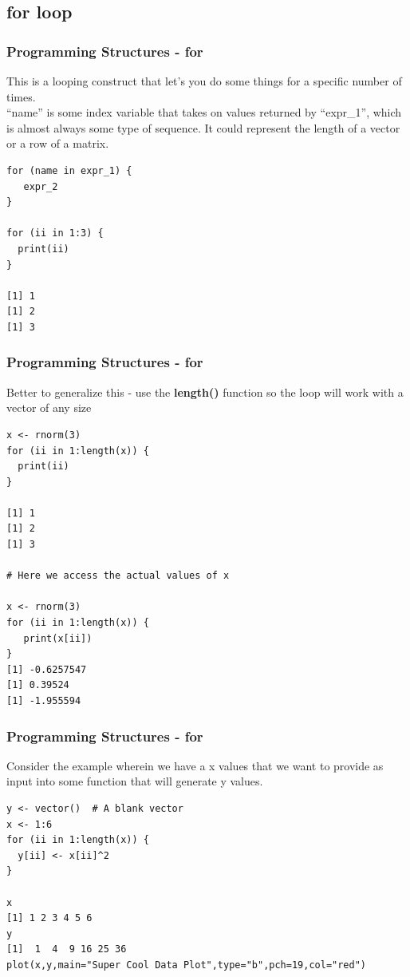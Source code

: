 \documentclass{beamer}
\begin{document}
\subsection{for loop}
\begin{frame}[fragile]
\frametitle{Programming Structures - for }
This is a looping construct that let's you do some things for a specific number of times.
\newline
\\
``name'' is some index variable that takes on values returned by ``expr\_1'', which is almost always some type of sequence. It could represent the length of a vector or a row of a matrix.

\small
\begin{verbatim}
for (name in expr_1) {
   expr_2
}

for (ii in 1:3) {
  print(ii)
}

[1] 1
[1] 2
[1] 3

\end{verbatim}
\end{frame}

%

\begin{frame}[fragile]
\frametitle{Programming Structures - for }
Better to generalize this - use the \textbf{length()} function so the loop will work with a vector of any size
\footnotesize
\begin{verbatim}
x <- rnorm(3)
for (ii in 1:length(x)) {
  print(ii)
}

[1] 1
[1] 2
[1] 3

# Here we access the actual values of x

x <- rnorm(3)
for (ii in 1:length(x)) {    
   print(x[ii])
}
[1] -0.6257547
[1] 0.39524
[1] -1.955594
\end{verbatim}
\end{frame}

%

\begin{frame}[fragile]
\frametitle{Programming Structures - for }
Consider the example wherein we have a x values that we want to provide as input into some function that will generate y values. 
\footnotesize
\begin{verbatim}
y <- vector()  # A blank vector
x <- 1:6
for (ii in 1:length(x)) {
  y[ii] <- x[ii]^2
}

x
[1] 1 2 3 4 5 6
y
[1]  1  4  9 16 25 36
plot(x,y,main="Super Cool Data Plot",type="b",pch=19,col="red")

\end{verbatim}
\end{frame}
\end{document}
